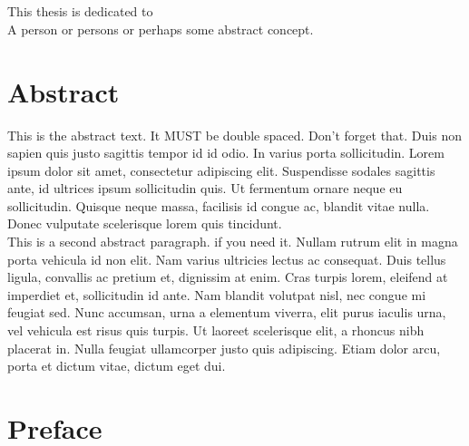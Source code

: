   \newpage
  \chapter*{}
  \thispagestyle{empty}
  This thesis is dedicated to\\
  A person or persons or perhaps some abstract concept.

  \newpage
  \chapter*{Abstract}
  \thispagestyle{empty}
  \vspace*{-0.7in}
  \renewcommand{\baselinestretch}{1.8}
  \normalsize{
  This is the abstract text. It MUST be double spaced. Don't forget that. Duis non sapien quis justo sagittis tempor id id odio. In varius porta sollicitudin. Lorem ipsum dolor sit amet, consectetur adipiscing elit. Suspendisse sodales sagittis ante, id ultrices ipsum sollicitudin quis. Ut fermentum ornare neque eu sollicitudin. Quisque neque massa, facilisis id congue ac, blandit vitae nulla. Donec vulputate scelerisque lorem quis tincidunt.
  } \vspace*{-0.2in} \\

  \normalsize{
  This is a second abstract paragraph. if you need it. Nullam rutrum elit in magna porta vehicula id non elit. Nam varius ultricies lectus ac consequat. Duis tellus ligula, convallis ac pretium et, dignissim at enim. Cras turpis lorem, eleifend at imperdiet et, sollicitudin id ante. Nam blandit volutpat nisl, nec congue mi feugiat sed. Nunc accumsan, urna a elementum viverra, elit purus iaculis urna, vel vehicula est risus quis turpis. Ut laoreet scelerisque elit, a rhoncus nibh placerat in. Nulla feugiat ullamcorper justo quis adipiscing. Etiam dolor arcu, porta et dictum vitae, dictum eget dui.
  }
  \renewcommand{\baselinestretch}{1.33}

  \newpage
  \chapter*{Preface}
  \thispagestyle{empty}
  \vspace*{-0.7in}


